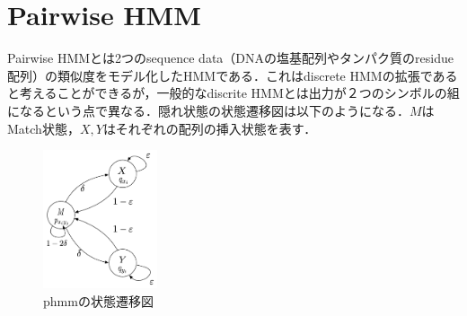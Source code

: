 %
%

\def\ba{\bm{a}}
\def\bb{\bm{b}}
\def\bc{\bm{c}}
\def\bd{\bm{d}}
\def\be{\bm{e}}
\def\bg{\bm{g}}
\def\bh{\bm{h}}
\def\bi{\bm{i}}
\def\bj{\bm{j}}
\def\bk{\bm{k}}
\def\bl{\bm{l}}
\def\bn{\bm{n}}
\def\bo{\bm{o}}
\def\bp{\bm{p}}
\def\bq{\bm{q}}
\def\br{\bm{r}}
\def\bs{\bm{s}}
\def\bt{\bm{t}}
\def\bu{\bm{u}}
\def\bv{\bm{v}}
\def\bw{\bm{w}}
\def\bx{\bm{x}}
\def\by{\bm{y}}
\def\bz{\bm{z}}

\def\bA{\bm{A}}
\def\bB{\bm{B}}
\def\bC{\bm{C}}
\def\bD{\bm{D}}
\def\bE{\bm{E}}
\def\bF{\bm{F}}
\def\bG{\bm{G}}
\def\bH{\bm{H}}
\def\bI{\bm{I}}
\def\bJ{\bm{J}}
\def\bK{\bm{K}}
\def\bL{\bm{L}}
\def\bM{\bm{M}}
\def\bN{\bm{N}}
\def\bO{\bm{O}}
\def\bP{\bm{P}}
\def\bQ{\bm{Q}}
\def\bR{\bm{R}}
\def\bS{\bm{S}}
\def\bT{\bm{T}}
\def\bU{\bm{U}}
\def\bV{\bm{V}}
\def\bW{\bm{W}}
\def\bX{\bm{X}}
\def\bY{\bm{Y}}
\def\bZ{\bm{Z}}

\section{Pairwise HMM}
\label{sec:phmm}
Pairwise HMMとは2つのsequence data（DNAの塩基配列やタンパク質のresidue配列）の類似度をモデル化したHMMである．これはdiscrete HMMの拡張であると考えることができるが，一般的なdiscrite HMMとは出力が２つのシンボルの組になるという点で異なる．隠れ状態の状態遷移図は以下のようになる．$M$はMatch状態，$X,Y$はそれぞれの配列の挿入状態を表す．

\begin{figure}[]
  \centering
  \includegraphics[width=0.3\textwidth, bb=0 0 300 400]{graffe/phmm_simple.pdf}  
  \caption{phmmの状態遷移図}
\end{figure}


